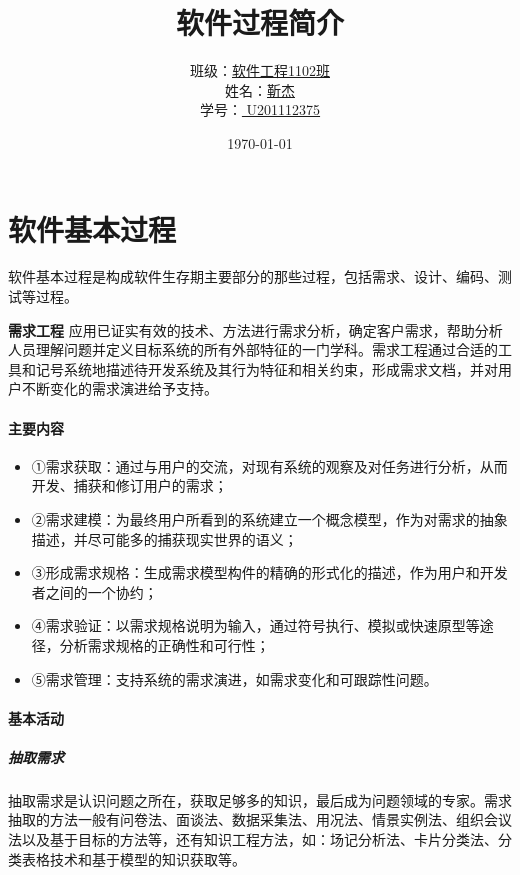\documentclass[UTF8,nofonts]{ctexart}
\title{\Huge 软件过程简介\vskip 8cm}
\author{\large	
  班级：\underline{软件工程1102班} \\姓名：\underline{\hspace{28pt}靳杰\hspace{30pt}}\hspace{10pt} \\学号：\underline{\hspace{10pt} U201112375 \hspace{10pt}}}
\date{\Large\today}
\makeatletter
\renewcommand{\section}{\@startsection{section}{1}{0mm}
  {-\baselineskip}{0.5\baselineskip}{\fontsize{16pt}{16pt}\bf\leftline}}
\makeatother
\begin{document}
\maketitle
\thispagestyle{fancy} %
\lhead{} %
\chead{} %
\rhead{} %
\lfoot{} %
\cfoot{} %
\rfoot{\thepage} %
\renewcommand{\headrulewidth}{0pt} %
\renewcommand{\footrulewidth}{0pt} %
\pagestyle{fancy}
\rfoot{\thepage}
\onecolumn{
\tableofcontents}
\newpage
\part{\textbf{软件基本过程}}
软件基本过程是构成软件生存期主要部分的那些过程，包括需求、设计、编码、测试等过程。
\section{\textbf{需求工程}}
应用已证实有效的技术、方法进行需求分析，确定客户需求，帮助分析人员理解问题并定义目标系统的所有外部特征的一门学科。需求工程通过合适的工具和记号系统地描述待开发系统及其行为特征和相关约束，形成需求文档，并对用户不断变化的需求演进给予支持。
\subsection{\textbf{主要内容}}
\begin{itemize}
 \setlength{\itemsep}{0pt}
 \setlength{\parskip}{0pt}
 \setlength{\parsep}{0pt}
\item ①需求获取：通过与用户的交流，对现有系统的观察及对任务进行分析，从而开发、捕获和修订用户的需求；
\item ②需求建模：为最终用户所看到的系统建立一个概念模型，作为对需求的抽象描述，并尽可能多的捕获现实世界的语义；
\item ③形成需求规格：生成需求模型构件的精确的形式化的描述，作为用户和开发者之间的一个协约；
\item ④需求验证：以需求规格说明为输入，通过符号执行、模拟或快速原型等途径，分析需求规格的正确性和可行性；
\item ⑤需求管理：支持系统的需求演进，如需求变化和可跟踪性问题。
\end{itemize}
\subsection{\textbf{基本活动}}
\subsubsection{\textbf{抽取需求}}
抽取需求是认识问题之所在，获取足够多的知识，最后成为问题领域的专家。需求抽取的方法一般有问卷法、面谈法、数据采集法、用况法、情景实例法、组织会议法以及基于目标的方法等，还有知识工程方法，如：场记分析法、卡片分类法、分类表格技术和基于模型的知识获取等。
\end{document}
